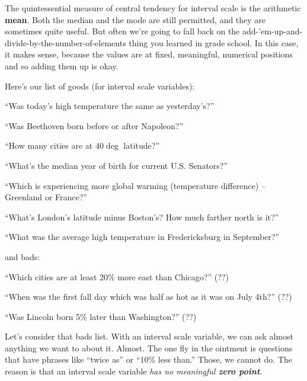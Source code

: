 The quintessential measure of central tendency for interval scale is the
arithmetic \textbf{mean}. Both the median and the mode are still permitted, and
they are sometimes quite useful. But often we're going to fall back on the
add-'em-up-and-divide-by-the-number-of-elements thing you learned in grade
school. In this case, it makes sense, because the values are at fixed,
meaningful, numerical positions and so adding them up is okay.

Here's our list of goods (for interval scale variables):

\begin{compactitem}
\item[\leftthumbsup] ``Was today's high temperature the same as yesterday's?''
\item[\leftthumbsup] ``Was Beethoven born before or after Napoleon?''
\item[\leftthumbsup] ``How many cities are at $40\deg$ latitude?''
\item[\leftthumbsup] ``What's the median year of birth for current U.S. Senators?''
\item[\leftthumbsup] ``Which is experiencing more global warming
(temperature difference) -- Greenland or France?''
\item[\leftthumbsup] ``What's London's latitude minus Boston's? How much
farther north is it?''
\item[\leftthumbsup] ``What was the average high temperature in Fredericksburg
in September?''
\end{compactitem}

and bads:

\begin{compactitem}
\item[\leftthumbsdown] ``Which cities are at least 20\% more east than
Chicago?'' (??)
\item[\leftthumbsdown] ``When was the first fall day which was half as hot as
it was on July 4th?'' (??)
\item[\leftthumbsdown] ``Was Lincoln born 5\% later than Washington?'' (??)
\end{compactitem}

Let's consider that bads list. With an interval scale variable, we can ask
almost anything we want to about it. Almost. The one fly in the ointment is
questions that have phrases like ``twice as'' or ``10\% less than.'' Those, we
cannot do. The reason is that an interval scale variable \textit{has no
meaningful \textbf{zero point}}.

